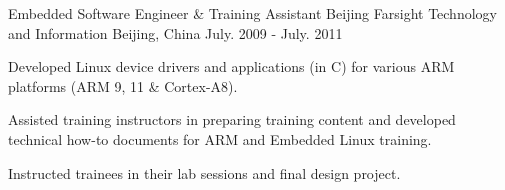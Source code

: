 \begin{cventries}
  \cventry
    {Embedded Software Engineer \& Training Assistant} %
    {Beijing Farsight Technology and Information} %
    {Beijing, China} %
    {July. 2009 - July. 2011} %
    {
      \begin{cvitems} %
        \item {Developed Linux device drivers and applications (in C) for various ARM
    platforms (ARM 9, 11 \& Cortex-A8).}
        \item {Assisted training instructors in preparing training
    content and developed technical how-to documents for ARM and
    Embedded Linux training.}
        \item {Instructed trainees in their lab sessions and final design project.}
      \end{cvitems}
    }

\end{cventries}
